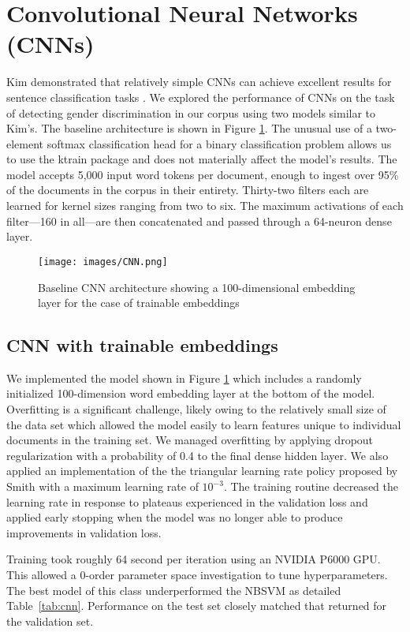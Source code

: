 \documentclass[twocolumn,10pt]{wmrDoc}
\begin{document}
\section{Convolutional Neural Networks (CNNs)}
Kim demonstrated that relatively simple CNNs can achieve excellent results for sentence classification tasks \cite{kim}.  We explored the performance of CNNs on the task of detecting gender discrimination in our corpus using two models similar to Kim's.  The baseline architecture is shown in Figure \ref{fig:CNN}.  The unusual use of a two-element softmax classification head for a binary classification problem allows us to use the ktrain package and does not materially affect the model's results.  The model accepts 5,000 input word tokens per document, enough to ingest over 95\% of the documents in the corpus in their entirety.  Thirty-two filters each are learned for kernel sizes ranging from two to six.  The maximum activations of each filter---160 in all---are then concatenated and passed through a 64-neuron dense layer.

\begin{figure}[h]
    \centering
    \texttt{[image: images/CNN.png]}
    \caption{Baseline CNN architecture showing a 100-dimensional embedding layer for the case of trainable embeddings}
    \label{fig:CNN}
\end{figure}

\subsection{CNN with trainable embeddings}
We implemented the model shown in Figure \ref{fig:CNN} which includes a randomly initialized 100-dimension word embedding layer at the bottom of the model.  Overfitting is a significant challenge, likely owing to the relatively small size of the data set which allowed the model easily to learn features unique to individual documents in the training set.  We managed overfitting by applying dropout regularization with a probability of 0.4 to the final dense hidden layer.  We also applied an implementation of the the triangular learning rate policy proposed by Smith \cite{smith2017} with a maximum learning rate of $10^{-3}$.  The training routine decreased the learning rate in response to plateaus experienced in the validation loss and applied early stopping when the model was no longer able to produce improvements in validation loss.

Training took roughly 64 second per iteration using an NVIDIA P6000 GPU.  This allowed a 0-order parameter space investigation to tune hyperparameters.  The best model of this class underperformed the NBSVM as detailed Table~\ref{tab:cnn}.  Performance on the test set closely matched that returned for the validation set.
\end{document}
